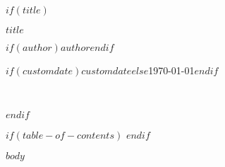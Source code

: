 \documentclass[$fontsize$]{article}
\begin{document}
$if(title)$
\begin{titlepage}
    \begin{center}

        \vspace*{5em}

        \linespread{1.0}
                {\Huge\bfseries $title$\par}

        \vspace*{5em}


        {\large 
        $if(author)$$author$$endif$

        $if(customdate)$$customdate$$else$\today$endif$}\\[3cm] 

    \end{center}
\end{titlepage}
$endif$

$if(table-of-contents)$
\tableofcontents
\newpage
$endif$

$body$
\end{document}
